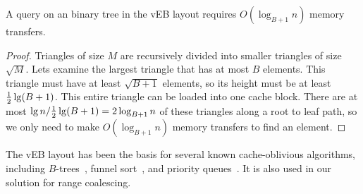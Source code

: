 \begin{lemma} 
A query on an binary tree in the vEB layout requires $O(\log_{B+1} n)$
memory transfers. 
\end{lemma}

\begin{proof} 
Triangles of size $M$ are recursively divided into smaller
triangles of size $\sqrt{M}$. Lets examine the largest triangle that has at most
$B$ elements. This triangle must have at least $\sqrt{B+1}$ elements, so its
height must be at least $\frac{1}{2}\lg \mathopen{}\left(B+1\right)\mathclose{}$. This entire triangle can be loaded
into one cache block. There are at most 
$\lg n/ \frac{1}{2}\lg \mathopen{}\left(B+1\right)\mathclose{} = 2 \log_{B+1} n$ 
of these triangles along a root to leaf path, so we only need to make
$O(\log_{B+1} n)$ memory transfers to find an element. 
\end{proof}

The vEB layout has been the basis for several known cache-oblivious algorithms, including 
$B$-trees~\cite{BayerMc72}, funnel sort~\cite{FrigoLePr99}, and priority 
queues~\cite{ArgeBeDe02,BrodalFa02}. It is also used in our solution for range coalescing. 



